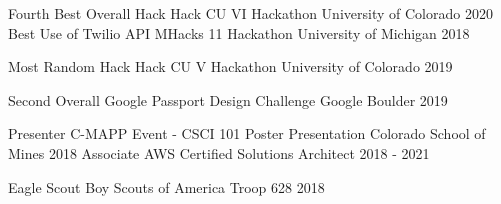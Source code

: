 
\vspace{-2.0mm}

\begin{cvhonors}

  \cvhonor
  {Fourth Best Overall Hack}
  {Hack CU VI Hackathon}
  {University of Colorado}
  {2020}
  \cvhonor
    {Best Use of Twilio API} %
    {MHacks 11 Hackathon}
    {University of Michigan} %
    {2018} %

  \cvhonor
    {Most Random Hack} %
    {Hack CU V Hackathon}
    {University of Colorado} %
    {2019} %
  
  \cvhonor
  {Second Overall}
  {Google Passport Design Challenge}
  {Google Boulder}
  {2019}

    \cvhonor
    {Presenter} %
    {C-MAPP Event - CSCI 101 Poster Presentation}
    {Colorado School of Mines} %
    {2018} %
  \cvhonor
    {Associate} %
    {AWS Certified Solutions Architect }
    {} %
    {2018 - 2021} %
    
    \cvhonor
    {Eagle Scout}
    {Boy Scouts of America}
    {Troop 628}
    {2018}

\end{cvhonors}
